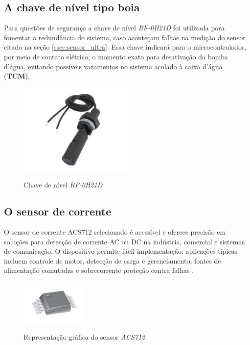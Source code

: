 \subsection{A chave de nível tipo boia}

Para questões de segurança a chave de nível \textit{RF-0H21D} foi utilizada para fomentar a redundância do sistema, caso aconteçam falhas na medição do sensor citado na seção \ref{ssec:sensor_ultra}. Essa chave indicará para o microcontrolador, por meio de contato elétrico, o momento exato para desativação da bomba d'água, evitando possíveis vazamentos no sistema acolado à caixa d'água (\textbf{TCM}). 

\begin{figure}[H]
	\centering
	\caption{Chave de nível \textit{RF-0H21D}}
	\includegraphics[width=0.5\textwidth]{figuras/chave_boia.png}
	\label{fig:chaveboia}
\end{figure}


\subsection{O sensor de corrente}

O sensor de corrente ACS712 selecionado é acessível e oferece precisão em soluções para detecção de corrente AC ou DC na indústria,
comercial e sistemas de comunicação. O dispositivo permite fácil implementação: aplicações típicas incluem controle de motor, detecção de carga e gerenciamento, fontes de alimentação comutadas e sobrecorrente proteção contra falhas \cite{ACS712}.


\begin{figure}[H]
	\centering
	\caption{Representação gráfica do sensor \textit{ACS712}}
	\includegraphics[width=0.3\textwidth]{figuras/ACS712.png}
	\label{fig:acs712}
\end{figure} 


